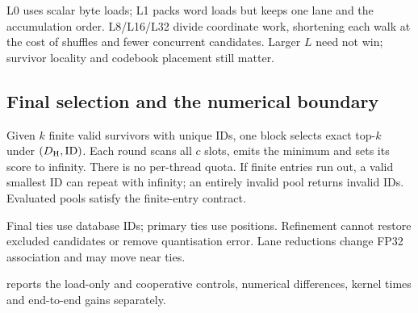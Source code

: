 L0 uses scalar byte loads; L1 packs word loads but keeps one lane and the accumulation order. L8/L16/L32 divide coordinate work, shortening each walk at the cost of shuffles and fewer concurrent candidates. Larger $L$ need not win; survivor locality and codebook placement still matter.

\subsection{Final selection and the numerical boundary}

Given $k$ finite valid survivors with unique IDs, one block selects exact top-$k$ under $(D_{\mathrm{H}},\mathrm{ID})$. Each round scans all $c$ slots, emits the minimum and sets its score to infinity. There is no per-thread quota. If finite entries run out, a valid smallest ID can repeat with infinity; an entirely invalid pool returns invalid IDs. Evaluated pools satisfy the finite-entry contract.

Final ties use database IDs; primary ties use positions. Refinement cannot restore excluded candidates or remove quantisation error. Lane reductions change FP32 association and may move near ties.

 reports the load-only and cooperative controls,
numerical differences, kernel times and end-to-end gains separately.
